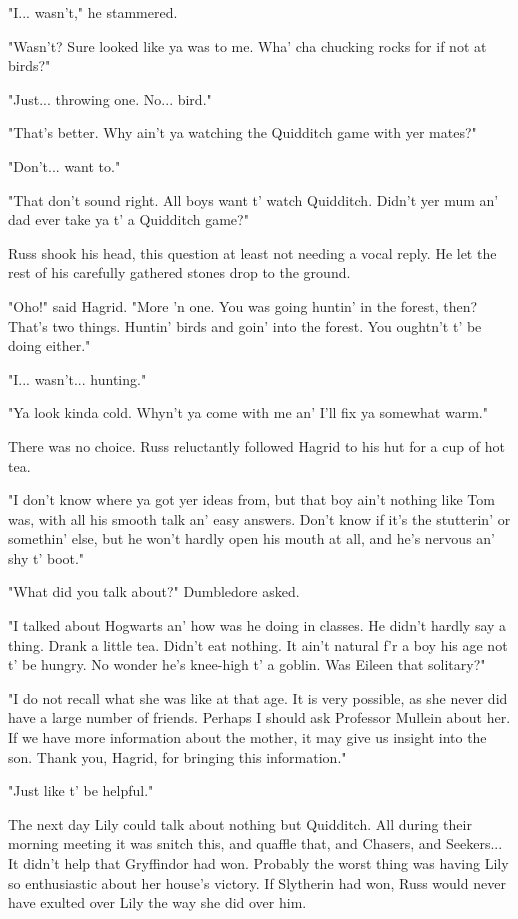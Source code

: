 \documentclass[a4paper,11pt]{article}
\begin{document}
"I... wasn't," he stammered.

"Wasn't? Sure looked like ya was to me. Wha' cha chucking rocks for if not at birds?"

"Just... throwing one. No... bird."

"That's better. Why ain't ya watching the Quidditch game with yer mates?"

"Don't... want to."

"That don't sound right. All boys want t' watch Quidditch. Didn't yer mum an' dad ever take ya t' a Quidditch game?"

Russ shook his head, this question at least not needing a vocal reply. He let the rest of his carefully gathered stones drop to the ground.

"Oho!" said Hagrid. "More 'n one. You was going huntin' in the forest, then? That's two things. Huntin' birds and goin' into the forest. You oughtn't t' be doing either."

"I... wasn't... hunting."

"Ya look kinda cold. Whyn't ya come with me an' I'll fix ya somewhat warm."

There was no choice. Russ reluctantly followed Hagrid to his hut for a cup of hot tea.

"I don't know where ya got yer ideas from, but that boy ain't nothing like Tom was, with all his smooth talk an' easy answers. Don't know if it's the stutterin' or somethin' else, but he won't hardly open his mouth at all, and he's nervous an' shy t' boot."

"What did you talk about?" Dumbledore asked.

"I talked about Hogwarts an' how was he doing in classes. He didn't hardly say a thing. Drank a little tea. Didn't eat nothing. It ain't natural f'r a boy his age not t' be hungry. No wonder he's knee-high t' a goblin. Was Eileen that solitary?"

"I do not recall what she was like at that age. It is very possible, as she never did have a large number of friends. Perhaps I should ask Professor Mullein about her. If we have more information about the mother, it may give us insight into the son. Thank you, Hagrid, for bringing this information."

"Just like t' be helpful."

The next day Lily could talk about nothing but Quidditch. All during their morning meeting it was snitch this, and quaffle that, and Chasers, and Seekers... It didn't help that Gryffindor had won. Probably the worst thing was having Lily so enthusiastic about her house's victory. If Slytherin had won, Russ would never have exulted over Lily the way she did over him.
\end{document}
